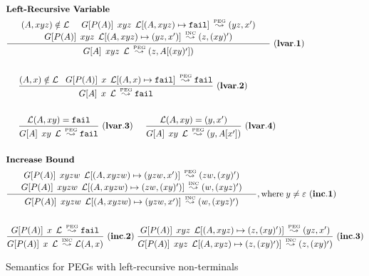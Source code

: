 \begin{figure}[t]
{\small
\begin{align*}
& \textbf{Left-Recursive Variable} \\
& 
{\frac{
\begin{array}{c}
\;\;\;\;
(A,xyz) \notin \mathcal{L} \interf
    \Matgm{P(A)}{xyz}{\mathcal{L}[(A,xyz) \mapsto \Nothing]} \Lp
    (yz,x^\prime)  \;\;\;\; \\ \;\;\;\;
				\Matgm{P(A)}{xyz}{\mathcal{L}[(A,xyz)
                                  \mapsto (yz,x^\prime)]} \Li
                                (z,(xy)^\prime) \;\;\;\;
\end{array}
}
	{\Matgm{A}{xyz}{\mathcal{L}} \Lp (z,A[(xy)^\prime])}} \mylabel{lvar.1} \\\\
& 
 \fivespaces {\frac{(A,x) \notin \mathcal{L} \;\;\;
    \Matgm{P(A)}{x}{\mathcal{L}[(A,x) \mapsto \Nothing]} \Lp \Nothing}
	{\Matgm{A}{x}{\mathcal{L}} \Lp \Nothing}} \mylabel{lvar.2} \\
      \\
&
      \fivespaces {\frac{\mathcal{L}(A,xy) = \Nothing}
	{\Matgm{A}{xy}{\mathcal{L}} \Lp \Nothing}} \mylabel{lvar.3}
      \interf
       {\frac{\mathcal{L}(A,xy) = (y,x^\prime)}
	{\Matgm{A}{xy}{\mathcal{L}} \Lp (y,A[x^\prime])}} \mylabel{lvar.4}
\\ \\
& \textbf{Increase Bound} \\
& 
{\frac{
\begin{array}{c}
\;\;\;\; \Matgm{P(A)}{xyzw}{\mathcal{L}[(A, xyzw) \mapsto (yzw,
      x^\prime)]} \Lp (zw, (xy)^\prime) \;\;\;\; \\  
\;\;\;\;	   \Matgm{P(A)}{xyzw}{\mathcal{L}[(A,xyzw) \mapsto (zw,
             (xy)^\prime)]} \Li (w, (xyz)^\prime) \;\;\;\;
\end{array}
}
	{\Matgm{P(A)}{xyzw}{\mathcal{L}[(A, xyzw) \mapsto (yzw,
            x^\prime)]} \Li (w, (xyz)^\prime)}} \mathrm{, where } \;y \neq \Epsi
	 \mylabel{inc.1} \\ \\
& 
{\frac{\Matgm{P(A)}{x}{\mathcal{L}} \Lp \Nothing}
	{\Matgm{P(A)}{x}{\mathcal{L}} \Li \mathcal{L}(A,x)}} \mylabel{inc.2}  
\;
{\frac{\Matgm{P(A)}{xyz}{\mathcal{L}[(A, xyz) \mapsto (z, (xy)^\prime)]} \Lp (yz, x^\prime)}
	{\Matgm{P(A)}{xyz}{\mathcal{L}[(A, xyz) \mapsto (z,
            (xy)^\prime)]} \Li (z, (xy)^\prime)}}
	 \mylabel{inc.3} 
\end{align*}
\caption{Semantics for PEGs with left-recursive non-terminals}
\label{fig:leftrecmemo}
}
\end{figure}

